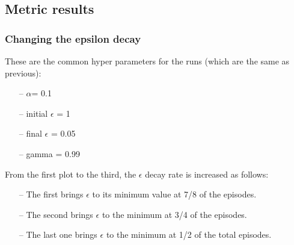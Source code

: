 \documentclass{article}
\begin{document}
\subsection{Metric results}


\subsubsection{Changing the epsilon decay}


These are the common hyper parameters for the runs (which are the same as previous):
\begin{itemize}
\item[--] $\alpha$= 0.1
\item[--] initial $\epsilon$ = 1
\item[--] final $\epsilon$ = 0.05
\item[--] gamma = 0.99
\end{itemize}

From the first plot to the third, the $\epsilon$ decay rate is increased as follows:

\begin{itemize}
\item[--] The first brings $\epsilon$ to its minimum value at 7/8 of the episodes.
\item[--] The second brings $\epsilon$ to the minimum at 3/4 of the episodes.
\item[--] The last one brings $\epsilon$ to the minimum at 1/2 of the total episodes.
\end{itemize}


\begin{center}
\centering
{}
\end{center}

\begin{center}
\centering
{}
\end{center}
\end{document}
